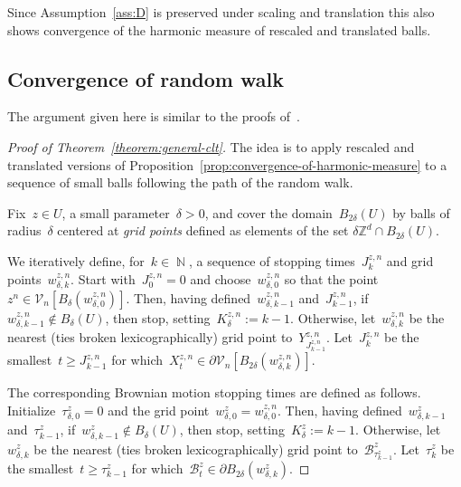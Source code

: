 \documentclass[12pt]{amsart}
\numberwithin{equation}{section}
\DeclareMathOperator{\N}{\mathbb{N}}
\newcommand*{\Zd}{\ensuremath{\mathbb{Z}^d}}
\newcommand{\V}{\mathcal{V}}
\begin{document}
Since Assumption~\ref{ass:D} is preserved under scaling and translation this also shows convergence of the harmonic measure of rescaled and translated balls.  





\subsection{Convergence of random walk}
The argument given here is similar to the proofs of~\cite[Lemma 3.14 and Theorem 3.10]{GMSInvariance}.


\begin{proof}[Proof of Theorem~\ref{theorem:general-clt}]
	The idea is to apply rescaled and translated versions of Proposition~\ref{prop:convergence-of-harmonic-measure} to a sequence of small balls following the path of the random walk. 
	


	Fix~$z \in U$, a small parameter~$\delta > 0$, and cover the domain~$B_{2\delta}(U)$ by balls of radius~$\delta$ centered at \emph{grid points} 
	defined as elements of the set $\delta \Zd \cap B_{2 \delta}(U)$.  
	
	We iteratively define, for~$k \in \N$, a sequence of stopping times~$J^{z, n}_{k}$ and grid points~$w_{\delta, k}^{z, n}$.  Start with~$J^{z, n}_0 = 0$ and choose~$w_{\delta,0}^{z, n}$ so that the point~$z^{n} \in \V_n[B_{\delta}(w_{\delta,0}^{z, n})]$. Then, having defined~$w_{\delta, k-1}^{z, n}$ and~$J^{z, n}_{k-1}$,
	if~$w_{\delta, k-1}^{z, n} \not \in B_{\delta}(U)$, then stop, setting~$K_{\delta}^{z, n} := k-1$. Otherwise, let~$w_{\delta, k}^{z, n}$ be the nearest (ties broken lexicographically)	grid point to~$Y^{z, n}_{J^{z, n}_{k-1}}$. Let~$J^{z, n}_{k}$ be 
	the smallest~$t \geq J^{z, n}_{k-1}$ for which~$X_t^{z, n} \in \partial \V_n[B_{2 \delta}(w_{\delta,k}^{z, n})]$. 
	
	The corresponding Brownian motion stopping times are defined as follows. Initialize~$\tau^z_{\delta, 0} = 0$ 
	and the grid point~$w_{\delta, 0}^{z} = w_{\delta, 0}^{z, n}$. Then, having defined~$w_{\delta, k-1}^{z}$ and~$\tau^{z}_{k-1}$,
	if~$w_{\delta, k-1}^z \not \in B_{\delta}(U)$, then stop, setting~$K_{\delta}^z := k-1$. Otherwise, let~$w_{\delta, k}^z$ be the nearest (ties broken lexicographically)	grid point to~$\mathcal{B}^{z}_{\tau^{z}_{k-1}}$. Let~$\tau^{z}_{k}$ be 
	the smallest~$t \geq \tau^{z}_{k-1}$ for which~$\mathcal{B}_t^{z} \in \partial B_{2 \delta}(w_{\delta, k}^z)$. 
	

\end{proof}
\end{document}
